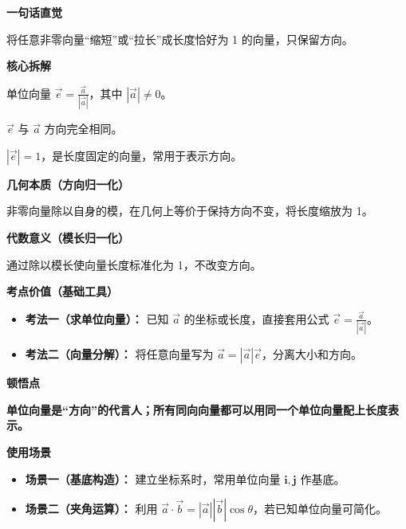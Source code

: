 \begin{explanationbox}
	\textbf{\textcolor{CExplanation}{一句话直觉}}

	将任意非零向量“缩短”或“拉长”成长度恰好为 1 的向量，只保留方向。

	\medskip
	\textbf{\textcolor{CExplanation}{核心拆解}}
	\begin{description}[style=nextline, leftmargin=2.8em, labelsep=0.5em, itemsep=0.45em]
		\item[\textbf{要点一（定义公式）：}] 单位向量 $\vec{e} = \frac{\vec{a}}{|\vec{a}|}$，其中 $|\vec{a}| \neq 0$。
		\item[\textbf{要点二（方向性）：}] $\vec{e}$ 与 $\vec{a}$ 方向完全相同。
		\item[\textbf{要点三（模为1）：}] $|\vec{e}| = 1$，是长度固定的向量，常用于表示方向。
	\end{description}

	\medskip
	\textbf{\textcolor{CExplanation}{几何本质（方向归一化）}}

	非零向量除以自身的模，在几何上等价于保持方向不变，将长度缩放为 1。

	\medskip
	\textbf{\textcolor{CExplanation}{代数意义（模长归一化）}}

	通过除以模长使向量长度标准化为 1，不改变方向。

	\medskip
	\textbf{\textcolor{CExplanation}{考点价值（基础工具）}}
	\begin{itemize}[leftmargin=*, itemsep=0.5em, topsep=0.4em]
		\item \textbf{考法一（求单位向量）：} 已知 $\vec{a}$ 的坐标或长度，直接套用公式 $\vec{e}=\frac{\vec{a}}{|\vec{a}|}$。
		\item \textbf{考法二（向量分解）：} 将任意向量写为 $\vec{a}=|\vec{a}|\vec{e}$，分离大小和方向。
	\end{itemize}

	\medskip
	\textbf{\textcolor{CExplanation}{顿悟点}}

	\textbf{单位向量是“方向”的代言人；所有同向向量都可以用同一个单位向量配上长度表示。}

	\medskip
	\textbf{\textcolor{CExplanation}{使用场景}}
	\begin{itemize}[leftmargin=*, itemsep=0.5em, topsep=0.4em]
		\item \textbf{场景一（基底构造）：} 建立坐标系时，常用单位向量 $\mathbf{i}, \mathbf{j}$ 作基底。
		\item \textbf{场景二（夹角运算）：} 利用 $\vec{a}\cdot\vec{b}=|\vec{a}||\vec{b}|\cos\theta$，若已知单位向量可简化。
	\end{itemize}
\end{explanationbox}
